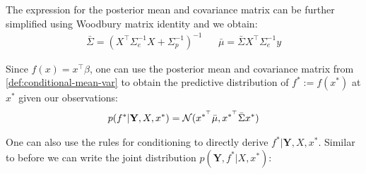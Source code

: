 The expression for the posterior mean and covariance matrix can be further simplified using Woodbury matrix identity
and we obtain:
\begin{align}\label{def:conditional-mean-var}
    \bar{\Sigma} = (X^{\top}\Sigma_e^{-1}X + \Sigma_p^{-1})^{-1} & & \bar{\mu} = \bar{\Sigma} X^{\top} \Sigma_e^{-1} y
\end{align}

Since $f(x) = x^{\top}\beta$, one can use the posterior mean and covariance matrix from
\ref{def:conditional-mean-var} to obtain the predictive distribution of $f^{\ast} := f(x^{\ast})$ at $x^{\ast}$
given our observations:
\begin{align}\label{def:predictive-dist}
    p(f^{\ast} | \mathbf{Y}, X, x^{\ast}) = \operatorname{\mathcal{N}}(x^{\ast^{\top}} \bar{\mu}, x^{\ast^{\top}} \bar{\Sigma} x^{\ast})
\end{align}

One can also use the rules for conditioning to directly derive $f^{\ast} | \mathbf{Y}, X, x^{\ast}$.
Similar to before we can write the joint distribution $p(\mathbf{Y}, f^{\ast}| X, x^{\ast})$:


